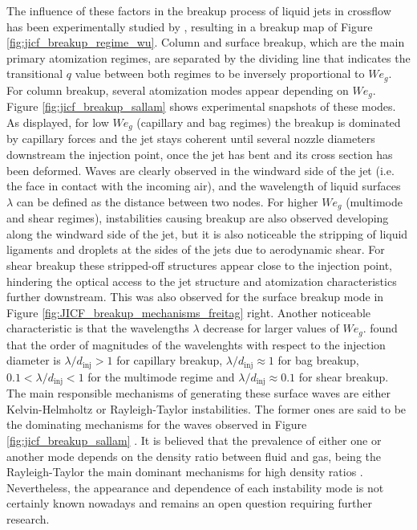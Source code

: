 The influence of these factors in the breakup process of liquid jets in crossflow has been experimentally studied by \citeColor[wu_breakup_1997], resulting in a breakup map of Figure \ref{fig:jicf_breakup_regime_wu}. Column and surface breakup, which are the main primary atomization regimes, are separated by the dividing line that indicates the transitional $q$ value between both regimes to be inversely proportional to $We_g$. For column breakup, several atomization modes appear depending on $We_g$. Figure \ref{fig:jicf_breakup_sallam} shows experimental snapshots of these modes. As displayed, for low $We_g$ (capillary and bag regimes) the breakup is dominated by capillary forces and the jet stays coherent until several nozzle diameters downstream the injection point, once the jet has bent and its cross section has been deformed. Waves are clearly observed in the windward side of the jet (i.e. the face in contact with the incoming air), and the wavelength of liquid surfaces $\lambda$ can be defined as the distance between two nodes.  For higher $We_g$ (multimode and shear regimes), instabilities causing breakup are also observed developing along the windward side of the jet, but it is also noticeable the stripping of liquid ligaments and droplets at the sides of the jets due to aerodynamic shear. For shear breakup these stripped-off structures appear close to the injection point, hindering the optical access to the jet structure and atomization characteristics further downstream. This was also observed for the surface breakup mode in Figure \ref{fig:JICF_breakup_mechanisms_freitag} right. Another noticeable characteristic is that the wavelengths $\lambda$ decrease for larger values of $We_g$.  found that the order of magnitudes of the wavelenghts with respect to the injection diameter is $\lambda/d_\mathrm{inj} > 1$ for capillary breakup, $\lambda/d_\mathrm{inj} \approx 1$ for bag breakup, $0.1 < \lambda/d_\mathrm{inj} < 1$ for the multimode regime and $\lambda/d_\mathrm{inj} \approx 0.1$ for shear breakup. The main responsible mechanisms of generating these surface waves are either Kelvin-Helmholtz or Rayleigh-Taylor instabilities. The former ones are said to be the dominating mechanisms for the waves observed in Figure \ref{fig:jicf_breakup_sallam} . It is believed that the prevalence of either one or another mode depends on the density ratio between fluid and gas, being the Rayleigh-Taylor the main dominant mechanisms for high density ratios . Nevertheless, the appearance and dependence of each instability mode is not certainly known nowadays and remains an open question requiring further research.

